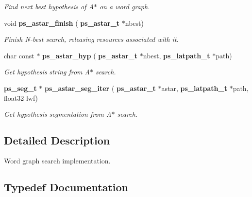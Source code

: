 \begin{DoxyCompactItemize}
\begin{DoxyCompactList}\small\item\em Find next best hypothesis of A$\ast$ on a word graph. \end{DoxyCompactList}\item 
\mbox{\label{ps__lattice__internal_8h_abfb03e9e0fcbe3def45120f5ba43be14}} 
void \textbf{ ps\+\_\+astar\+\_\+finish} (\textbf{ ps\+\_\+astar\+\_\+t} $\ast$nbest)
\begin{DoxyCompactList}\small\item\em Finish N-\/best search, releasing resources associated with it. \end{DoxyCompactList}\item 
\mbox{\label{ps__lattice__internal_8h_ac7372b5c5ec111f6814ce1ba495593e4}} 
char const  $\ast$ \textbf{ ps\+\_\+astar\+\_\+hyp} (\textbf{ ps\+\_\+astar\+\_\+t} $\ast$nbest, \textbf{ ps\+\_\+latpath\+\_\+t} $\ast$path)
\begin{DoxyCompactList}\small\item\em Get hypothesis string from A$\ast$ search. \end{DoxyCompactList}\item 
\mbox{\label{ps__lattice__internal_8h_ac8e3dff7276c03c93377d0cb79fbdbd7}} 
\textbf{ ps\+\_\+seg\+\_\+t} $\ast$ \textbf{ ps\+\_\+astar\+\_\+seg\+\_\+iter} (\textbf{ ps\+\_\+astar\+\_\+t} $\ast$astar, \textbf{ ps\+\_\+latpath\+\_\+t} $\ast$path, float32 lwf)
\begin{DoxyCompactList}\small\item\em Get hypothesis segmentation from A$\ast$ search. \end{DoxyCompactList}\end{DoxyCompactItemize}


\subsection{Detailed Description}
Word graph search implementation. 



\subsection{Typedef Documentation}
\mbox{\label{ps__lattice__internal_8h_a32dd9511afc2f024dc63c9c060261e94}} 

